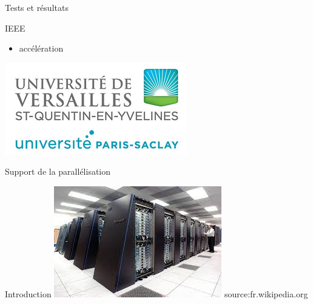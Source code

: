 \documentclass{beamer}
\begin{document}
\begin{frame}{Tests et résultats}

  \begin{block}{IEEE}
    \begin{itemize}
    \item accélération
    \end{itemize}
    \centering\includegraphics[scale=0.27]{../ressources/a.jpeg}
  \end{block}
  
\end{frame}

\begin{frame}{Support de la parallélisation}

  \begin{block}{Introduction}
    \includegraphics[width=0.6\linewidth]{../ressources/index.jpeg}
    source:fr.wikipedia.org
  \end{block}

\end{frame}
\end{document}
